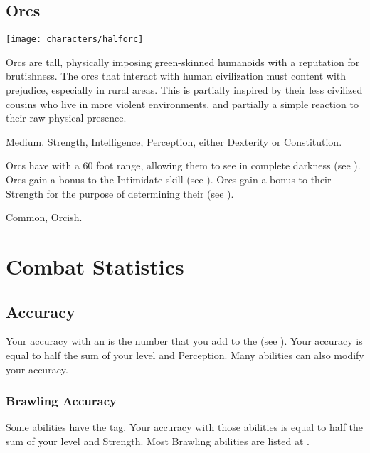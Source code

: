     \subsection{Orcs}
        \texttt{[image: characters/halforc]}

        Orcs are tall, physically imposing green-skinned humanoids with a reputation for brutishness.
        The orcs that interact with human civilization must content with prejudice, especially in rural areas.
        This is partially inspired by their less civilized cousins who live in more violent environments, and partially a simple reaction to their raw physical presence.

         Medium.
          Strength,  Intelligence,  Perception, either  Dexterity or  Constitution.
        \begin{raggeditemize}
             Orcs have  with a 60 foot range, allowing them to see in complete darkness (see ).
             Orcs gain a  bonus to the Intimidate skill (see ).
             Orcs gain a  bonus to their Strength for the purpose of determining their  (see ).
        \end{raggeditemize}
         Common, Orcish.

\section{Combat Statistics}

    \subsection{Accuracy}\label{Accuracy}
        Your accuracy with an  is the number that you add to the  (see ).
        Your accuracy is equal to half the sum of your level and Perception.
        Many abilities can also modify your accuracy.

        \subsubsection{Brawling Accuracy}\label{Brawling Accuracy}
            Some abilities have the  tag.
            Your accuracy with those abilities is equal to half the sum of your level and Strength.
            Most Brawling abilities are listed at .

